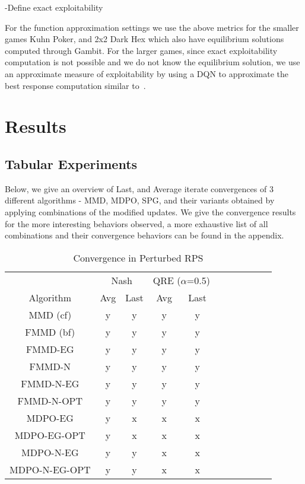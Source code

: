 -Define exact exploitability

For the function approximation settings we use the above metrics for the smaller games Kuhn Poker,
and 2x2 Dark Hex which also have equilibrium solutions computed through Gambit.
For the larger games, since exact exploitability computation is not possible and we do not know the
equilibrium solution, we use an approximate measure of exploitability by using a DQN to approximate
the best response computation similar to~\cite{sokotaUnified2023}.

\section{Results}

\subsection{Tabular Experiments}
Below, we give an overview of Last, and Average iterate convergences of 3 different algorithms -
MMD, MDPO, SPG, and their variants obtained by applying combinations of the modified updates.
We give the convergence results for the more interesting behaviors observed, a more exhaustive list
of all combinations and their convergence behaviors can be found in the appendix.

\begin{table}
	\centering
	\begin{tabular}{|c|c|c|c|c|c|c|c|c|c|c|}
		\hline
		& \multicolumn{2}{c|}{Nash} & \multicolumn{2}{c|}{QRE ($\alpha$=0.5)}              \\
		\cline{2-5}
		Algorithm         		& Avg & Last & Avg & Last \\
		 \toprule 
		\hline MMD (cf)			& y & y & y & y \\ 
		\hline FMMD (bf)		& y & y & y & y \\
		\hline FMMD-EG			& y & y & y & y \\
		\hline FMMD-N			& y & y & y & y \\
		\hline FMMD-N-EG		& y & y & y & y \\
		\hline FMMD-N-OPT		& y & y & y & y \\
		\hline MDPO-EG			& y & x & x & x \\
		\hline MDPO-EG-OPT		& y & x & x & x \\
		\hline MDPO-N-EG		& y & y & x & x \\
		\hline MDPO-N-EG-OPT	& y & y & x & x \\
		\hline

	\end{tabular} \caption{Convergence in Perturbed RPS}
	\label{tab:tabular}
\end{table}

